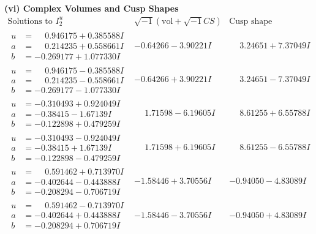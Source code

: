 \documentclass[1p]{elsarticle_modified}
\theoremstyle{definition}
\newcommand{\I}{\sqrt{-1}}
\begin{document}
\newpage\flushleft \textbf{(vi) Complex Volumes and Cusp Shapes}
$$\begin{array}{c|c|c}  
\text{Solutions to }I^u_{2}& \I (\text{vol} + \sqrt{-1}CS) & \text{Cusp shape}\\
 \hline 
\begin{aligned}
u &= \phantom{-}0.946175 + 0.385588 I \\
a &= \phantom{-}0.214235 + 0.558661 I \\
b &= -0.269177 + 1.077330 I\end{aligned}
 & -0.64266 - 3.90221 I & \phantom{-}3.24651 + 7.37049 I \\ \hline\begin{aligned}
u &= \phantom{-}0.946175 - 0.385588 I \\
a &= \phantom{-}0.214235 - 0.558661 I \\
b &= -0.269177 - 1.077330 I\end{aligned}
 & -0.64266 + 3.90221 I & \phantom{-}3.24651 - 7.37049 I \\ \hline\begin{aligned}
u &= -0.310493 + 0.924049 I \\
a &= -0.38415 - 1.67139 I \\
b &= -0.122898 + 0.479259 I\end{aligned}
 & \phantom{-}1.71598 - 6.19605 I & \phantom{-}8.61255 + 6.55788 I \\ \hline\begin{aligned}
u &= -0.310493 - 0.924049 I \\
a &= -0.38415 + 1.67139 I \\
b &= -0.122898 - 0.479259 I\end{aligned}
 & \phantom{-}1.71598 + 6.19605 I & \phantom{-}8.61255 - 6.55788 I \\ \hline\begin{aligned}
u &= \phantom{-}0.591462 + 0.713970 I \\
a &= -0.402644 - 0.443888 I \\
b &= -0.208294 - 0.706719 I\end{aligned}
 & -1.58446 + 3.70556 I & -0.94050 - 4.83089 I \\ \hline\begin{aligned}
u &= \phantom{-}0.591462 - 0.713970 I \\
a &= -0.402644 + 0.443888 I \\
b &= -0.208294 + 0.706719 I\end{aligned}
 & -1.58446 - 3.70556 I & -0.94050 + 4.83089 I \\ \hline\begin{aligned}

\end{aligned}
\end{array}$$
\end{document}
